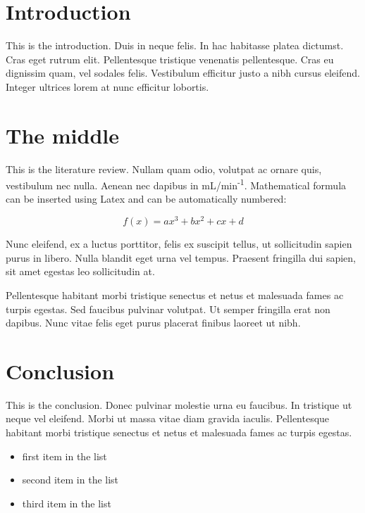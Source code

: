 \documentclass[12pt,a4paper,]{report}
\providecommand{\tightlist}{%
  \setlength{\itemsep}{0pt}\setlength{\parskip}{0pt}}
\begin{document}
\hypertarget{introduction}{%
\section{Introduction}\label{introduction}}

This is the introduction. Duis in neque felis. In hac habitasse platea
dictumst. Cras eget rutrum elit. Pellentesque tristique venenatis
pellentesque. Cras eu dignissim quam, vel sodales felis. Vestibulum
efficitur justo a nibh cursus eleifend. Integer ultrices lorem at nunc
efficitur lobortis.

\hypertarget{the-middle}{%
\section{The middle}\label{the-middle}}

This is the literature review. Nullam quam odio, volutpat ac ornare
quis, vestibulum nec nulla. Aenean nec dapibus in
mL/min\textsuperscript{-1}. Mathematical formula can be inserted using
Latex and can be automatically numbered:

\begin{equation}f(x) = ax^3 + bx^2 + cx + d\label{eq:my_equation}\end{equation}

Nunc eleifend, ex a luctus porttitor, felis ex suscipit tellus, ut
sollicitudin sapien purus in libero. Nulla blandit eget urna vel tempus.
Praesent fringilla dui sapien, sit amet egestas leo sollicitudin at.

Pellentesque habitant morbi tristique senectus et netus et malesuada
fames ac turpis egestas. Sed faucibus pulvinar volutpat. Ut semper
fringilla erat non dapibus. Nunc vitae felis eget purus placerat finibus
laoreet ut nibh.

\hypertarget{conclusion}{%
\section{Conclusion}\label{conclusion}}

This is the conclusion. Donec pulvinar molestie urna eu faucibus. In
tristique ut neque vel eleifend. Morbi ut massa vitae diam gravida
iaculis. Pellentesque habitant morbi tristique senectus et netus et
malesuada fames ac turpis egestas.

\begin{itemize}
\tightlist
\item
  first item in the list
\item
  second item in the list
\item
  third item in the list
\end{itemize}
\end{document}
